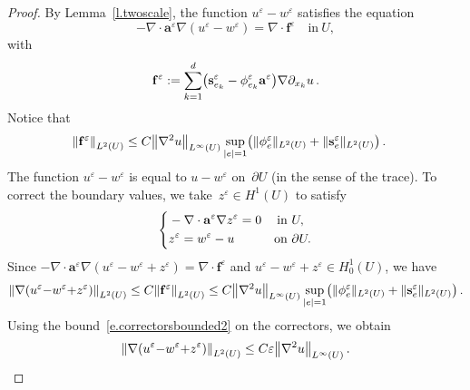 \documentclass[11pt]{article} %
\numberwithin{equation}{section}
\theoremstyle{definition}
\let\originalleft\left
\let\originalright\right
\renewcommand{\left}{\mathopen{}\mathclose\bgroup\originalleft}
\renewcommand{\right}{\aftergroup\egroup\originalright}
\newcommand{\eps}{\varepsilon}
\newcommand{\f}{\mathbf{f}}
\newcommand{\s}{\mathbf{s}}
\newcommand{\ep}{\eps}
\renewcommand{\a}{\mathbf{a}}
\begin{document}
\begin{proof}
By Lemma~\ref{l.twoscale}, the function $u^\ep - w^\ep$ satisfies the equation
\begin{equation}
\label{e.uepwep}
-\nabla \cdot \a^\ep \nabla (u^\ep - w^\ep) = \nabla \cdot \f^\ep \quad \mbox{in} \ U,
\end{equation}
with
\begin{equation}
\label{e.def.fep}
\f^\ep := \sum_{k=1}^d 
\left(
\s_{e_k}^\ep 
-
\phi_{e_k}^\ep \a^\ep 
\right)
\nabla \partial_{x_k} u 
\,.
\end{equation}
Notice that 
\begin{align}
\label{e.beforecorrectors}
\left\| \f^\ep \right\|_{{L}^2(U)} 
& 
\leq 
C \left\| \nabla^2 u \right\|_{L^\infty(U)} 
\sup_{|e| =1} \bigl( \| \phi^\ep_e \|_{L^2(U)} + \| \s^\ep_e \|_{L^2(U)} \bigr)
\,.
\end{align}
%
The function $u^\ep - w^\ep$ is equal to $u-w^\ep$ on~$\partial U$ (in the sense of the trace). To correct the boundary values, we take~$z^\ep\in H^1(U)$ to satisfy 
\begin{equation*}
\left\{
\begin{aligned}
& -\nabla \cdot \a^\ep \nabla z^\ep = 0 & \mbox{in} & \ U,  \\
& z^\ep = w^\ep - u & \mbox{on} & \ \partial U. 
\end{aligned}
\right.
\end{equation*}
Since $-\nabla \cdot \a^\ep  \nabla (u^\ep - w^\ep + z^\ep) = \nabla \cdot\f^\ep$ and $u^\ep - w^\ep + z^\ep\in H^1_0(U)$, we have
\begin{equation}
\label{e.uepwepzep.0}
\left\| \nabla (u^\ep {-} w^\ep {+} z^\ep) \right\|_{L^2(U)} 
\leq
C \left\| \f^\ep \right\|_{L^2(U)} 
\leq
C \left\| \nabla^2 u \right\|_{L^\infty(U)} 
\sup_{|e| =1} \bigl( \| \phi^\ep_e \|_{L^2(U)} + \| \s^\ep_e \|_{L^2(U)} \bigr)
\,.
\end{equation}
Using the bound~\eqref{e.correctorsbounded2} on the correctors, we obtain
\begin{equation}
\label{e.uepwepzep}
\left\| \nabla (u^\ep {-} w^\ep {+} z^\ep) \right\|_{L^2(U)} 
\leq
C \ep \left\| \nabla^2 u \right\|_{L^\infty(U)} 
\,.

\end{equation}
\end{proof}
\end{document}
